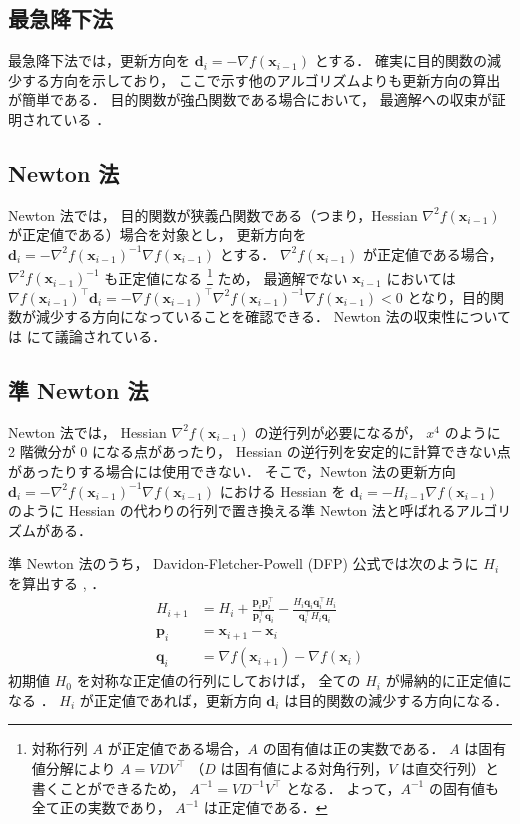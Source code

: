\subsection{最急降下法}

最急降下法では，更新方向を $\bm{d}_i = -\nabla f(\bm{x}_{i-1})$ とする．
確実に目的関数の減少する方向を示しており，
ここで示す他のアルゴリズムよりも更新方向の算出が簡単である．
目的関数が強凸関数である場合において，
最適解への収束が証明されている
\cite[Section 9.3.1]{Boyd2004}．

\subsection{Newton 法}

Newton 法では，
目的関数が狭義凸関数である（つまり，Hessian $\nabla^2 f(\bm{x}_{i-1})$ が正定値である）場合を対象とし，
更新方向を
$\bm{d}_i = -\nabla^2 f(\bm{x}_{i-1})^{-1} \nabla f(\bm{x}_{i-1})$
とする．
$\nabla^2 f(\bm{x}_{i-1})$ が正定値である場合，
$\nabla^2 f(\bm{x}_{i-1})^{-1}$ も正定値になる
\footnote{%
対称行列 $A$ が正定値である場合，$A$ の固有値は正の実数である．%
$A$ は固有値分解により $A=VDV^\top$ （$D$ は固有値による対角行列，$V$ は直交行列）と書くことができるため，%
$A^{-1} = VD^{-1}V^\top$ となる．%
よって，$A^{-1}$ の固有値も全て正の実数であり，%
$A^{-1}$ は正定値である．%
}
ため，
最適解でない $\bm{x}_{i-1}$ においては
$\nabla f(\bm{x}_{i-1})^\top \bm{d}_i = -\nabla f(\bm{x}_{i-1})^\top \nabla^2 f(\bm{x}_{i-1})^{-1} \nabla f(\bm{x}_{i-1}) < 0$
となり，目的関数が減少する方向になっていることを確認できる．
Newton 法の収束性については \cite[Section 9.5.3, 9.6.4]{Boyd2004} にて議論されている．

\subsection{準 Newton 法}

Newton 法では，
Hessian $\nabla^2 f(\bm{x}_{i-1})$ の逆行列が必要になるが，
$x^4$ のように 2 階微分が 0 になる点があったり，
Hessian の逆行列を安定的に計算できない点があったりする場合には使用できない．
そこで，Newton 法の更新方向
$\bm{d}_i = -\nabla^2 f(\bm{x}_{i-1})^{-1} \nabla f(\bm{x}_{i-1})$
における Hessian を
$\bm{d}_i = -H_{i-1} \nabla f(\bm{x}_{i-1})$
のように Hessian の代わりの行列で置き換える準 Newton 法と呼ばれるアルゴリズムがある．

準 Newton 法のうち，
Davidon-Fletcher-Powell (DFP) 公式では次のように $H_i$ を算出する
\cite[Section 9.3]{Luenberger2003}, \cite[Section 10.9]{Press2007}．
\begin{align}
    H_{i+1} &= H_i + \frac{\bm{p}_i \bm{p}_i^\top}{\bm{p}_i^\top \bm{q}_i}
        - \frac{H_i \bm{q}_i \bm{q}_i^\top H_i}{\bm{q}_i^\top H_i \bm{q}_i} \\
    \bm{p}_i &= \bm{x}_{i+1} - \bm{x}_i \\
    \bm{q}_i &= \nabla f(\bm{x}_{i+1}) - \nabla f(\bm{x}_i)
\end{align}
初期値 $H_0$ を対称な正定値の行列にしておけば，
全ての $H_i$ が帰納的に正定値になる
\cite[Section 9.3]{Luenberger2003}．
$H_i$ が正定値であれば，更新方向 $\bm{d}_i$ は目的関数の減少する方向になる．

